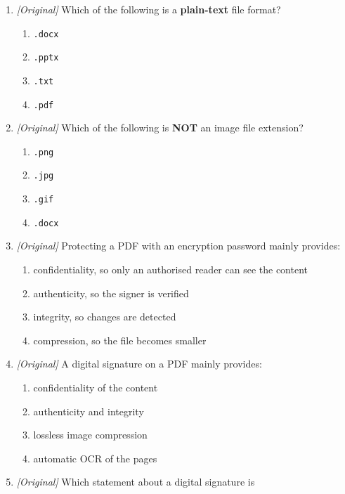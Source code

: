 \documentclass[11pt]{article}
\begin{document}
\begin{enumerate}[label=\textbf{Q\arabic*.}, leftmargin=*]
\begin{enumerate}[label=\Alph*.]
    \item Computer System Values
    \item Comma-Separated Values
    \item Common Spreadsheet Version
    \item Column-Sorted Variables
  \end{enumerate}
\item \textit{[Original]} Which of the following is a \textbf{plain-text}
  file format?
  \begin{enumerate}[label=\Alph*.]
    \item \texttt{.docx}
    \item \texttt{.pptx}
    \item \texttt{.txt}
    \item \texttt{.pdf}
  \end{enumerate}
\item \textit{[Original]} Which of the following is \textbf{NOT} an image
  file extension?
  \begin{enumerate}[label=\Alph*.]
    \item \texttt{.png}
    \item \texttt{.jpg}
    \item \texttt{.gif}
    \item \texttt{.docx}
  \end{enumerate}
\item \textit{[Original]} Protecting a PDF with an encryption password mainly
  provides:
  \begin{enumerate}[label=\Alph*.]
    \item confidentiality, so only an authorised reader can see the content
    \item authenticity, so the signer is verified
    \item integrity, so changes are detected
    \item compression, so the file becomes smaller
  \end{enumerate}
\item \textit{[Original]} A digital signature on a PDF mainly provides:
  \begin{enumerate}[label=\Alph*.]
    \item confidentiality of the content
    \item authenticity and integrity
    \item lossless image compression
    \item automatic OCR of the pages
  \end{enumerate}
\item \textit{[Original]} Which statement about a digital signature is

\end{enumerate}
\end{document}
